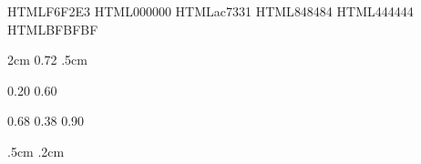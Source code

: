 
\definecolor{page-color}        {HTML}{F6F2E3}
\definecolor{default-color}     {HTML}{000000}
\definecolor{primary-color}     {HTML}{ac7331}
\definecolor{secondary-color}   {HTML}{848484}
\definecolor{dark-gray-color}   {HTML}{444444}
\definecolor{light-gray-color}  {HTML}{BFBFBF}

\setlength{\headerheigth}           {2cm}
\setlength{\headerwidth}            {0.72\textwidth}
\setlength{\headersep}              {.5cm}

\setlength{\profilepicturewidth}    {0.20\headerwidth}
\setlength{\titlesectionwidth}      {0.60\headerwidth}

\setlength{\leftcolumnwidth}        {0.68\textwidth}
\setlength{\rightcolumnwidth}       {0.38\textwidth}
\setlength{\contactsectionwidth}    {0.90\rightcolumnwidth}

\setlength{\contentindent}          {.5cm}
\renewcommand{\contentwidthratio}   {0.90}
\setlength{\contentsep}             {.2cm}
